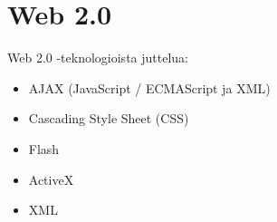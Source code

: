 
\chapter{Web 2.0}

Web 2.0 -teknologioista juttelua:

\begin{itemize}

\item AJAX (JavaScript / ECMAScript ja XML)
\item Cascading Style Sheet (CSS)
\item Flash
\item ActiveX
\item XML

\end{itemize}

